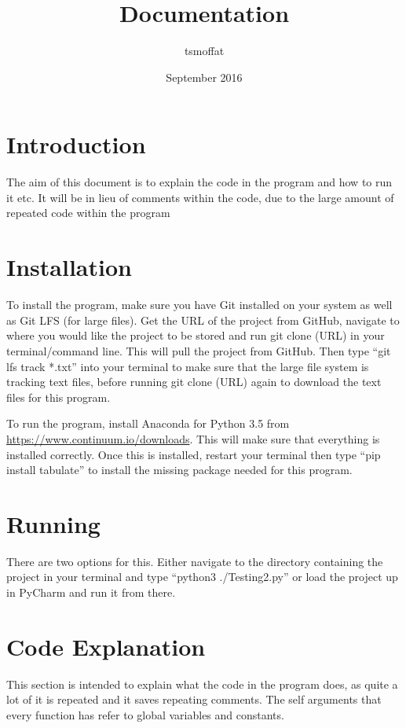 \documentclass{article}
\title{Documentation}
\author{tsmoffat}
\date{September 2016}
\newcommand{\q}[1]{``#1''}
\begin{document}
\maketitle

\section{Introduction}
The aim of this document is to explain the code in the program and how to run it etc. It will be in
lieu of comments within the code, due to the large amount of repeated code within the program

\section{Installation}
To install the program, make sure you have Git installed on your system as well as Git LFS (for
large files). Get the URL of the project from GitHub, navigate to where you would like the project
to be stored and run git clone (URL) in your terminal/command line. This will pull the project from
GitHub. Then type \q{git lfs track *.txt} into your terminal to make sure that the large file system
is tracking text files, before running git clone (URL) again to download the text files for this
program.\par To run the program, install Anaconda for Python 3.5 from
\url{https://www.continuum.io/downloads}. This will make sure that everything is installed
correctly. Once this is installed, restart your terminal then type \q{pip install tabulate} to
install the missing package needed for this program.


\section{Running}
There are two options for this. Either navigate to the directory containing the project in your terminal and type \q{python3 ./Testing2.py} or load the project up in PyCharm and run it from there.


\section{Code Explanation} This section is intended to explain what the code in the program does, as
quite a lot of it is repeated and it saves repeating comments. The self arguments that every
function has refer to global variables and constants.
\end{document}
